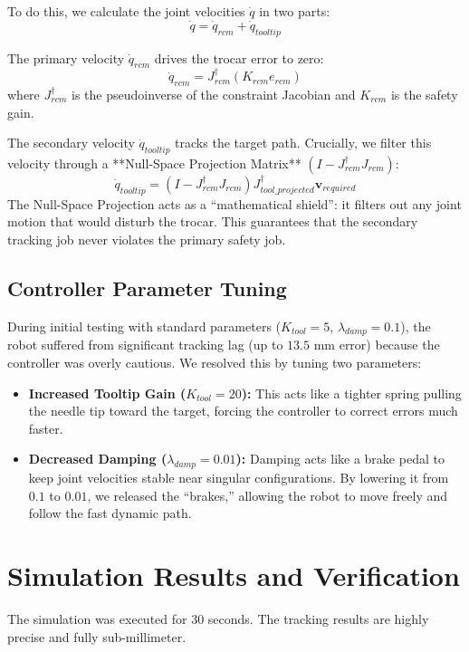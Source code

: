 \documentclass[11pt,a4paper]{article}
\begin{document}
To do this, we calculate the joint velocities $\dot{q}$ in two parts:
\begin{equation}
    \dot{q} = \dot{q}_{rcm} + \dot{q}_{tooltip}
\end{equation}

The primary velocity $\dot{q}_{rcm}$ drives the trocar error to zero:
\begin{equation}
    \dot{q}_{rcm} = J_{rcm}^{\dagger} (K_{rcm} e_{rcm})
\end{equation}
where $J_{rcm}^{\dagger}$ is the pseudoinverse of the constraint Jacobian and $K_{rcm}$ is the safety gain.

The secondary velocity $\dot{q}_{tooltip}$ tracks the target path. Crucially, we filter this velocity through a **Null-Space Projection Matrix** $(I - J_{rcm}^{\dagger} J_{rcm})$:
\begin{equation}
    \dot{q}_{tooltip} = (I - J_{rcm}^{\dagger} J_{rcm}) J_{tool\_projected}^{\dagger} \boldsymbol{v}_{required}
\end{equation}
The Null-Space Projection acts as a ``mathematical shield'': it filters out any joint motion that would disturb the trocar. This guarantees that the secondary tracking job never violates the primary safety job.

\subsection{Controller Parameter Tuning}
During initial testing with standard parameters ($K_{tool} = 5$, $\lambda_{damp} = 0.1$), the robot suffered from significant tracking lag (up to $13.5\text{ mm}$ error) because the controller was overly cautious. We resolved this by tuning two parameters:
\begin{itemize}
    \item \textbf{Increased Tooltip Gain ($K_{tool} = 20$):} This acts like a tighter spring pulling the needle tip toward the target, forcing the controller to correct errors much faster.
    \item \textbf{Decreased Damping ($\lambda_{damp} = 0.01$):} Damping acts like a brake pedal to keep joint velocities stable near singular configurations. By lowering it from $0.1$ to $0.01$, we released the ``brakes,'' allowing the robot to move freely and follow the fast dynamic path.
\end{itemize}

\section{Simulation Results and Verification}
The simulation was executed for 30 seconds. The tracking results are highly precise and fully sub-millimeter.
\end{document}
